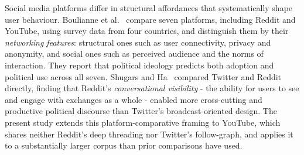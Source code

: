 Social media platforms differ in structural affordances that systematically
shape user behaviour. Boulianne et al.~\cite{boulianne2025} compare seven
platforms, including Reddit and YouTube, using survey data from four countries,
and distinguish them by their \emph{networking features}: structural ones such
as user connectivity, privacy and anonymity, and social ones such as perceived
audience and the norms of interaction. They report that political ideology
predicts both adoption and political use across all seven. Shugars and Ha~\cite{shugars2025}
compared Twitter and Reddit directly, finding that Reddit's \emph{conversational
visibility} - the ability for users to see and engage with exchanges as a
whole - enabled more cross-cutting and productive political discourse than
Twitter's broadcast-oriented design. The present study extends this
platform-comparative framing to YouTube, which shares neither Reddit's deep
threading nor Twitter's follow-graph, and applies it to a substantially larger corpus than
prior comparisons have used.

